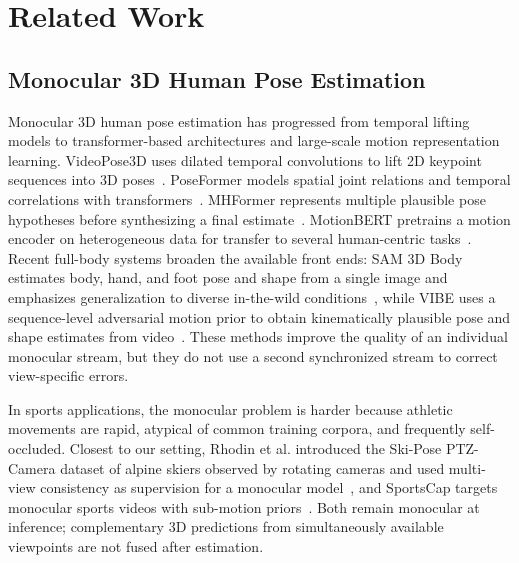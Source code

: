 \documentclass[preprint,12pt]{elsarticle}
\begin{document}
\section{Related Work}
\label{sec:related_work}

\subsection{Monocular 3D Human Pose Estimation}
Monocular 3D human pose estimation has progressed from temporal lifting models to transformer-based architectures and large-scale motion representation learning. VideoPose3D uses dilated temporal convolutions to lift 2D keypoint sequences into 3D poses~\cite{pavllo2019videopose3d}. PoseFormer models spatial joint relations and temporal correlations with transformers~\cite{zheng2021poseformer}. MHFormer represents multiple plausible pose hypotheses before synthesizing a final estimate~\cite{li2022mhformer}. MotionBERT pretrains a motion encoder on heterogeneous data for transfer to several human-centric tasks~\cite{zhu2023motionbert}. Recent full-body systems broaden the available front ends: SAM 3D Body estimates body, hand, and foot pose and shape from a single image and emphasizes generalization to diverse in-the-wild conditions~\cite{yang2026sam}, while VIBE uses a sequence-level adversarial motion prior to obtain kinematically plausible pose and shape estimates from video~\cite{kocabas2020vibe}. These methods improve the quality of an individual monocular stream, but they do not use a second synchronized stream to correct view-specific errors.

In sports applications, the monocular problem is harder because athletic movements are rapid, atypical of common training corpora, and frequently self-occluded. Closest to our setting, Rhodin et al. introduced the Ski-Pose PTZ-Camera dataset of alpine skiers observed by rotating cameras and used multi-view consistency as supervision for a monocular model~\cite{rhodin2018learning}, and SportsCap targets monocular sports videos with sub-motion priors~\cite{chen2021sportscap}. Both remain monocular at inference; complementary 3D predictions from simultaneously available viewpoints are not fused after estimation.
\end{document}
